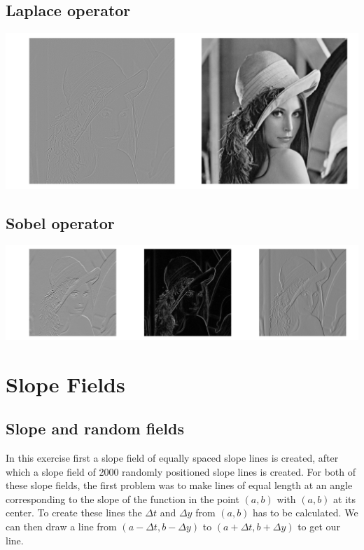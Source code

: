 \documentclass[a4paper,12px]{article}
\begin{document}
\subsection{Laplace operator}



\begin{center}
    \includegraphics[width=\textwidth]{laplace}
\end{center}

\subsection{Sobel operator}



\begin{center}
    \includegraphics[width=\textwidth]{sobel}
\end{center}

\clearpage
\section{Slope Fields}
\subsection{Slope and random fields}

In this exercise first a slope field of equally spaced slope lines is created,
after which a slope field of 2000 randomly positioned slope lines is created.
For both of these slope fields, the first problem was to make lines of equal
length at an angle corresponding to the slope of the function in the point
$(a,b)$ with $(a,b)$ at its center. To create these lines the $\Delta t$ and
$\Delta y$ from $(a,b)$ has to be calculated. We can then draw a line from
$(a-\Delta t, b-\Delta y)$ to $(a+\Delta t, b+\Delta y)$ to get our line.
\end{document}
